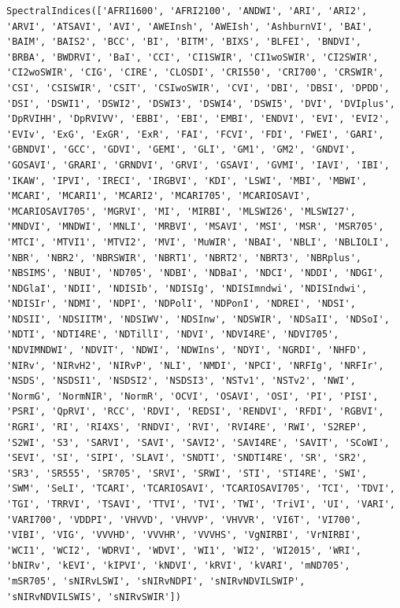 \documentclass[
  french,
  11pt,
  letterpaper,
  open=any,
  twoside=false,
  french]{scrbook}
\begin{document}
\begin{verbatim}
SpectralIndices(['AFRI1600', 'AFRI2100', 'ANDWI', 'ARI', 'ARI2', 'ARVI', 'ATSAVI', 'AVI', 'AWEInsh', 'AWEIsh', 'AshburnVI', 'BAI', 'BAIM', 'BAIS2', 'BCC', 'BI', 'BITM', 'BIXS', 'BLFEI', 'BNDVI', 'BRBA', 'BWDRVI', 'BaI', 'CCI', 'CI1SWIR', 'CI1woSWIR', 'CI2SWIR', 'CI2woSWIR', 'CIG', 'CIRE', 'CLOSDI', 'CRI550', 'CRI700', 'CRSWIR', 'CSI', 'CSISWIR', 'CSIT', 'CSIwoSWIR', 'CVI', 'DBI', 'DBSI', 'DPDD', 'DSI', 'DSWI1', 'DSWI2', 'DSWI3', 'DSWI4', 'DSWI5', 'DVI', 'DVIplus', 'DpRVIHH', 'DpRVIVV', 'EBBI', 'EBI', 'EMBI', 'ENDVI', 'EVI', 'EVI2', 'EVIv', 'ExG', 'ExGR', 'ExR', 'FAI', 'FCVI', 'FDI', 'FWEI', 'GARI', 'GBNDVI', 'GCC', 'GDVI', 'GEMI', 'GLI', 'GM1', 'GM2', 'GNDVI', 'GOSAVI', 'GRARI', 'GRNDVI', 'GRVI', 'GSAVI', 'GVMI', 'IAVI', 'IBI', 'IKAW', 'IPVI', 'IRECI', 'IRGBVI', 'KDI', 'LSWI', 'MBI', 'MBWI', 'MCARI', 'MCARI1', 'MCARI2', 'MCARI705', 'MCARIOSAVI', 'MCARIOSAVI705', 'MGRVI', 'MI', 'MIRBI', 'MLSWI26', 'MLSWI27', 'MNDVI', 'MNDWI', 'MNLI', 'MRBVI', 'MSAVI', 'MSI', 'MSR', 'MSR705', 'MTCI', 'MTVI1', 'MTVI2', 'MVI', 'MuWIR', 'NBAI', 'NBLI', 'NBLIOLI', 'NBR', 'NBR2', 'NBRSWIR', 'NBRT1', 'NBRT2', 'NBRT3', 'NBRplus', 'NBSIMS', 'NBUI', 'ND705', 'NDBI', 'NDBaI', 'NDCI', 'NDDI', 'NDGI', 'NDGlaI', 'NDII', 'NDISIb', 'NDISIg', 'NDISImndwi', 'NDISIndwi', 'NDISIr', 'NDMI', 'NDPI', 'NDPolI', 'NDPonI', 'NDREI', 'NDSI', 'NDSII', 'NDSIITM', 'NDSIWV', 'NDSInw', 'NDSWIR', 'NDSaII', 'NDSoI', 'NDTI', 'NDTI4RE', 'NDTillI', 'NDVI', 'NDVI4RE', 'NDVI705', 'NDVIMNDWI', 'NDVIT', 'NDWI', 'NDWIns', 'NDYI', 'NGRDI', 'NHFD', 'NIRv', 'NIRvH2', 'NIRvP', 'NLI', 'NMDI', 'NPCI', 'NRFIg', 'NRFIr', 'NSDS', 'NSDSI1', 'NSDSI2', 'NSDSI3', 'NSTv1', 'NSTv2', 'NWI', 'NormG', 'NormNIR', 'NormR', 'OCVI', 'OSAVI', 'OSI', 'PI', 'PISI', 'PSRI', 'QpRVI', 'RCC', 'RDVI', 'REDSI', 'RENDVI', 'RFDI', 'RGBVI', 'RGRI', 'RI', 'RI4XS', 'RNDVI', 'RVI', 'RVI4RE', 'RWI', 'S2REP', 'S2WI', 'S3', 'SARVI', 'SAVI', 'SAVI2', 'SAVI4RE', 'SAVIT', 'SCoWI', 'SEVI', 'SI', 'SIPI', 'SLAVI', 'SNDTI', 'SNDTI4RE', 'SR', 'SR2', 'SR3', 'SR555', 'SR705', 'SRVI', 'SRWI', 'STI', 'STI4RE', 'SWI', 'SWM', 'SeLI', 'TCARI', 'TCARIOSAVI', 'TCARIOSAVI705', 'TCI', 'TDVI', 'TGI', 'TRRVI', 'TSAVI', 'TTVI', 'TVI', 'TWI', 'TriVI', 'UI', 'VARI', 'VARI700', 'VDDPI', 'VHVVD', 'VHVVP', 'VHVVR', 'VI6T', 'VI700', 'VIBI', 'VIG', 'VVVHD', 'VVVHR', 'VVVHS', 'VgNIRBI', 'VrNIRBI', 'WCI1', 'WCI2', 'WDRVI', 'WDVI', 'WI1', 'WI2', 'WI2015', 'WRI', 'bNIRv', 'kEVI', 'kIPVI', 'kNDVI', 'kRVI', 'kVARI', 'mND705', 'mSR705', 'sNIRvLSWI', 'sNIRvNDPI', 'sNIRvNDVILSWIP', 'sNIRvNDVILSWIS', 'sNIRvSWIR'])
\end{verbatim}
\end{document}

